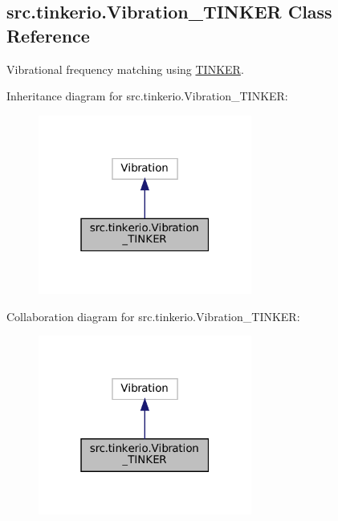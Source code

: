 \hypertarget{classsrc_1_1tinkerio_1_1Vibration__TINKER}{}\subsection{src.\+tinkerio.\+Vibration\+\_\+\+T\+I\+N\+K\+ER Class Reference}
\label{classsrc_1_1tinkerio_1_1Vibration__TINKER}


Vibrational frequency matching using \hyperlink{classsrc_1_1tinkerio_1_1TINKER}{T\+I\+N\+K\+ER}.  




Inheritance diagram for src.\+tinkerio.\+Vibration\+\_\+\+T\+I\+N\+K\+ER\+:
\nopagebreak
\begin{figure}[H]
\begin{center}
\leavevmode
\includegraphics[width=199pt]{classsrc_1_1tinkerio_1_1Vibration__TINKER__inherit__graph}
\end{center}
\end{figure}


Collaboration diagram for src.\+tinkerio.\+Vibration\+\_\+\+T\+I\+N\+K\+ER\+:
\nopagebreak
\begin{figure}[H]
\begin{center}
\leavevmode
\includegraphics[width=199pt]{classsrc_1_1tinkerio_1_1Vibration__TINKER__coll__graph}
\end{center}
\end{figure}
